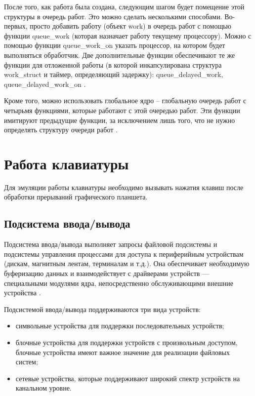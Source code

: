 После того, как работа была создана, следующим шагом будет помещение этой структуры в очередь работ. Это можно сделать несколькими способами. Во-первых, просто добавить работу (объект work) в очередь работ с помощью функции queue\_work (которая назначает работу текущему процессору). Можно с помощью функции queue\_work\_on указать процессор, на котором будет выполняться обработчик.
Две дополнительные функции обеспечивают те же функции для отложенной работы (в которой инкапсулирована структура work\_struct и таймер, определяющий задержку): queue\_delayed\_work, queue\_delayed\_work\_on \cite{WorkQueue}.

Кроме того, можно использовать глобальное ядро -- глобальную очередь работ с четырьмя функциями, которые работают с этой очередью работ. Эти функции имитируют предыдущие функции, за исключением лишь того, что не нужно определять структуру очереди работ \cite{WorkQueue}.

\section{Работа клавиатуры}

Для эмуляции работы клавиатуры необходимо вызывать нажатия клавиш после обработки прерываний графического планшета.

\subsection{Подсистема ввода/вывода}

Подсистема ввода/вывода выполняет запросы файловой подсистемы и подсистемы управления процессами для доступа к периферийным устройствам (дискам, магнитным лентам, терминалам и т.д.). Она обеспечивает необходимую буферизацию данных и взаимодействует с драйверами устройств — специальными модулями ядра, непосредственно обслуживающими внешние устройства \cite{Subsystem}.

Подсистемой ввода/вывода поддерживаются три вида устройств:

\begin{itemize}
    \item символьные устройства для поддержки последовательных устройств;
    \item блочные устройства для поддержки устройств с произвольным доступом, блочные устройства имеют важное значение для реализации файловых систем;
    \item сетевые устройства, которые поддерживают широкий спектр устройств на канальном уровне.
\end{itemize}

